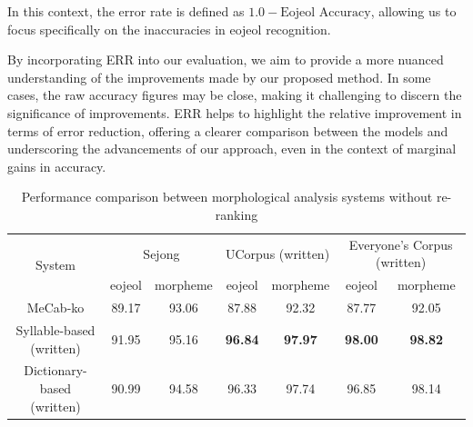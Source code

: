 \documentclass[AMS,STIX2COL]{WileyNJD-v2}
\begin{document}
    In this context, the error rate is defined as \(1.0 - \text{Eojeol Accuracy}\), allowing us to focus specifically on the inaccuracies in eojeol recognition.

    By incorporating ERR into our evaluation, we aim to provide a more nuanced understanding of the improvements made by our proposed method.
    In some cases, the raw accuracy figures may be close, making it challenging to discern the significance of improvements.
    ERR helps to highlight the relative improvement in terms of error reduction, offering a clearer comparison between the models and underscoring the advancements of our approach, even in the context of marginal gains in accuracy.


    \begin{table}[ht]
        \caption{Performance comparison between morphological analysis systems without re-ranking}
        \label{tab:performance-without-reranking}
        \begin{tabular*}{500pt}{@{\extracolsep\fill}c|cccccc@{\extracolsep\fill}}
            \toprule
            \multirow{2}{*}{System}                & \multicolumn{2}{c}{Sejong}                                & \multicolumn{2}{c}{UCorpus (written)}                     & \multicolumn{2}{c}{Everyone's Corpus (written)}           \\
            \cmidrule{2-3} \cmidrule{4-5} \cmidrule{6-7}
            ~                                      & \multicolumn{1}{c}{eojeol} & \multicolumn{1}{c}{morpheme} & \multicolumn{1}{c}{eojeol} & \multicolumn{1}{c}{morpheme} & \multicolumn{1}{c}{eojeol} & \multicolumn{1}{c}{morpheme} \\
            \midrule
            \hspace{2mm}MeCab-ko                   & 89.17                      & 93.06                        & 87.88                      & 92.32                        & 87.77                      & 92.05                        \\
            \hspace{2mm}Syllable-based (written)   & 91.95                      & 95.16                        & \textbf{96.84}             & \textbf{97.97}               & \textbf{98.00}             & \textbf{98.82}               \\
            \hspace{2mm}Dictionary-based (written) & 90.99                      & 94.58                        & 96.33                      & 97.74                        & 96.85                      & 98.14                        \\

\end{tabular*}
\end{table}
\end{document}
